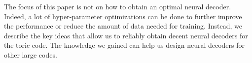 The focus of this paper is not on how to obtain an optimal neural decoder.
Indeed, a lot of hyper-parameter optimizations can be done to further improve the performance or reduce the amount of data needed for training.
Instead, we describe the key ideas that allow us to reliably obtain decent neural decoders for the toric code.
The knowledge we gained can help us design neural decoders for other large codes.